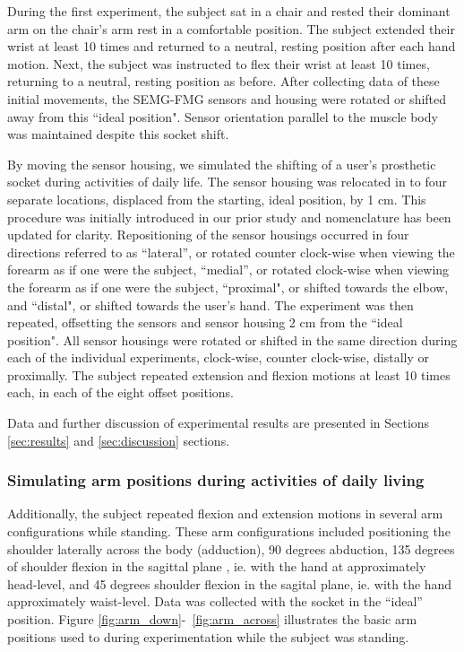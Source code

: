 \documentclass[twocolumn]{sagej}
\begin{document}
During the first experiment, the subject sat in a chair and rested their dominant arm on the chair's arm rest in a comfortable position.  The subject extended their wrist at least 10 times and returned to a neutral, resting position after each hand motion.  Next, the subject was instructed to flex their wrist at least 10 times, returning to a neutral, resting position as before.  After collecting data of these initial movements, the SEMG-FMG sensors and housing were rotated or shifted away from this ``ideal position".  Sensor orientation parallel to the muscle body was maintained despite this socket shift.    \par \noindent 
By moving the sensor housing, we simulated the shifting of a user's prosthetic socket during activities of daily life.  The sensor housing was relocated in to four separate locations, displaced from the starting, ideal position, by 1 cm.  This procedure was initially introduced in our prior study \cite{SanfordSPIE2015a} and nomenclature has been updated for clarity. Repositioning of the sensor housings occurred in four directions referred to as ``lateral'', or rotated counter clock-wise when viewing the forearm as if one were the subject, ``medial'', or rotated clock-wise when viewing the forearm as if one were the subject, ``proximal", or shifted towards the elbow, and ``distal", or shifted towards the user's hand.  The experiment was then repeated, offsetting the sensors and sensor housing 2 cm from the ``ideal position".  All sensor housings were rotated or shifted in the same direction during each of the individual experiments, clock-wise, counter clock-wise, distally or proximally.  The subject repeated extension and flexion motions at least 10 times each, in each of the eight offset positions. \par \noindent
Data and further discussion of experimental results are presented in Sections \ref{sec:results} and \ref{sec:discussion} sections.\par \noindent

\subsubsection{Simulating arm positions during activities of daily living}
\label{sec:exp_prot-ADL}

Additionally, the subject repeated flexion and extension motions in several arm configurations while standing.  These arm configurations included positioning the shoulder laterally across the body (adduction), 90 degrees abduction, 135 degrees of shoulder flexion in the sagittal plane , ie. with the hand at approximately head-level, and 45 degrees shoulder flexion in the sagital plane, ie. with the hand approximately waist-level.  Data was collected with the socket in the ``ideal'' position.  Figure \ref{fig:arm_down}-~\ref{fig:arm_across} illustrates the basic arm positions used to during experimentation while the subject was standing.  \par \noindent
\end{document}
